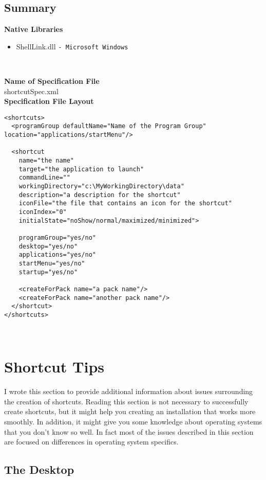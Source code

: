 \subsection{Summary}

\textbf{Native Libraries}
\begin{itemize}
\item ShellLink.dll \texttt{- Microsoft Windows}
\end{itemize}\

\textbf{Name of Specification File}\\
shortcutSpec.xml\\

\textbf{Specification File Layout}
\footnotesize
\begin{verbatim}
<shortcuts>
  <programGroup defaultName="Name of the Program Group" location="applications/startMenu"/>

  <shortcut 
    name="the name"
    target="the application to launch"
    commandLine=""
	workingDirectory="c:\MyWorkingDirectory\data"
    description="a description for the shortcut"
    iconFile="the file that contains an icon for the shortcut" 
    iconIndex="0"
    initialState="noShow/normal/maximized/minimized">

    programGroup="yes/no"
    desktop="yes/no" 
    applications="yes/no" 
    startMenu="yes/no" 
    startup="yes/no"
  
    <createForPack name="a pack name"/>
    <createForPack name="another pack name"/>
  </shortcut>
</shortcuts>
\end{verbatim}\
\normalsize

\section{Shortcut Tips}

I wrote this section to provide additional information about issues
surrounding the creation of shortcuts. Reading this section is not
necessary to successfully create shortcuts, but it might help you
creating an installation that works more smoothly. In addition, it might
give you some knowledge about operating systems that you don't know so
well. In fact most of the issues described in this section are focused
on differences in operating system specifics.\\

\subsection{The Desktop}

